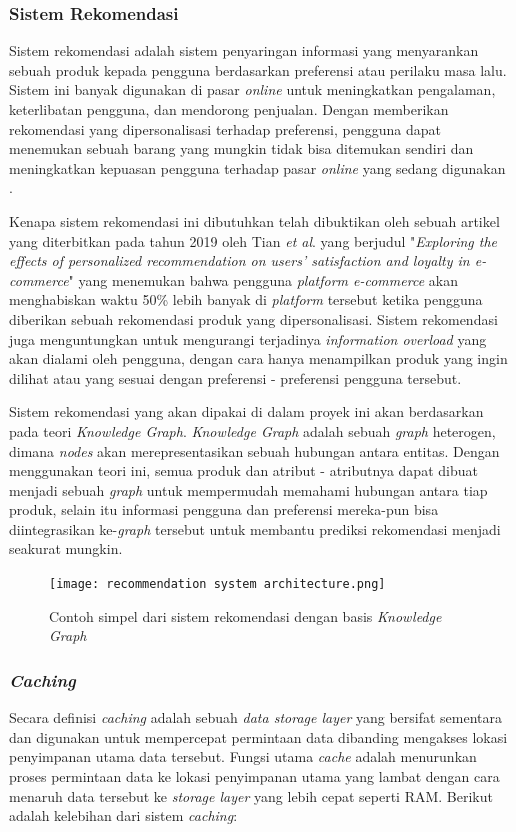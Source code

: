 \documentclass[a4paper]{article}
\newcommand{\subsubbab}[1]{%
    \subsubsection{#1}%
}
\begin{document}
\subsubbab{Sistem Rekomendasi}
Sistem rekomendasi adalah sistem penyaringan informasi yang menyarankan sebuah produk kepada pengguna berdasarkan preferensi atau perilaku masa lalu. Sistem ini banyak digunakan di pasar \textit{online} untuk meningkatkan pengalaman, keterlibatan pengguna, dan mendorong penjualan. Dengan memberikan rekomendasi yang dipersonalisasi terhadap preferensi, pengguna dapat menemukan sebuah barang yang mungkin tidak bisa ditemukan sendiri dan meningkatkan kepuasan pengguna terhadap pasar \textit{online} yang sedang digunakan \autocite[163-168]{adiwardana2019}.

Kenapa sistem rekomendasi ini dibutuhkan telah dibuktikan oleh sebuah artikel yang diterbitkan pada tahun 2019 oleh Tian \textit{et al}. yang berjudul "\textit{Exploring the effects of personalized recommendation on users' satisfaction and loyalty in e-commerce}" yang menemukan bahwa pengguna \textit{platform e-commerce}  akan menghabiskan waktu 50\% lebih banyak di \textit{platform} tersebut ketika pengguna diberikan sebuah rekomendasi produk yang dipersonalisasi\autocite[101-102]{tian2019exploring}. Sistem rekomendasi juga menguntungkan untuk mengurangi terjadinya \textit{information overload} yang akan dialami oleh pengguna, dengan cara hanya menampilkan produk yang ingin dilihat atau yang sesuai dengan preferensi - preferensi pengguna tersebut\autocite[123-127]{karimi2018news}.

Sistem rekomendasi yang akan dipakai di dalam proyek ini akan berdasarkan pada teori \textit{Knowledge Graph}. \textit{Knowledge Graph} adalah sebuah \textit{graph} heterogen, dimana \textit{nodes} akan merepresentasikan sebuah hubungan antara entitas\autocite{guo2020survey}. Dengan menggunakan teori ini, semua produk dan atribut - atributnya dapat dibuat menjadi sebuah \textit{graph} untuk mempermudah memahami hubungan antara tiap produk, selain itu informasi pengguna dan preferensi mereka-pun bisa diintegrasikan ke-\textit{graph} tersebut untuk membantu prediksi rekomendasi menjadi seakurat mungkin.

\begin{figure}[h]
    \centering
    \texttt{[image: recommendation system architecture.png]}
    \caption{Contoh simpel dari sistem rekomendasi dengan basis \textit{Knowledge Graph}}
\end{figure}

\subsubbab{\textit{Caching}}
Secara definisi \textit{caching} adalah sebuah \textit{data storage layer} yang bersifat sementara dan digunakan untuk mempercepat permintaan data dibanding mengakses lokasi penyimpanan utama data tersebut. Fungsi utama \textit{cache} adalah menurunkan proses permintaan data ke lokasi penyimpanan utama yang lambat dengan cara menaruh data tersebut ke \textit{storage layer} yang lebih cepat seperti RAM\autocite{AWS-caching}. Berikut adalah kelebihan dari sistem \textit{caching}:
\end{document}
